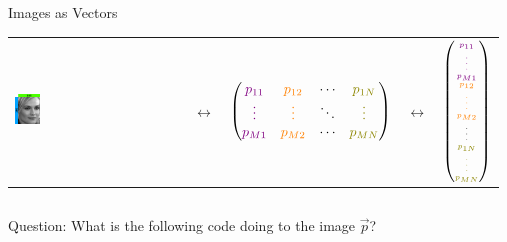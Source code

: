 \documentclass[10pt,aspectratio=169,usenames,dvipsnames]{beamer} %
\begin{document}
\begin{frame}[fragile]{Images as Vectors}
\begin{center}
	\begin{tabular}{m{2.5cm} m{1cm} c m{1cm} c}
	\includegraphics[width=0.15\textwidth]{images/vectormatrix/ImageToVector} &
	$\longleftrightarrow$ &
	$\begin{pmatrix}
		\textcolor{violet}{p_{11}} & \textcolor{orange}{p_{12}} & \cdots & \textcolor{olive}{p_{1N}} \\
		\textcolor{violet}{\vdots} & \textcolor{orange}{\vdots} & \ddots & \textcolor{olive}{\vdots} \\
		\textcolor{violet}{p_{M1}} & \textcolor{orange}{p_{M2}} & \cdots &  \textcolor{olive}{p_{MN}} \\
	\end{pmatrix}$ &
	$\longleftrightarrow$ &
	$\tiny{\begin{pmatrix}
		\textcolor{violet}{p_{11}} \\
		\textcolor{violet}{\vdots} \\
		\textcolor{violet}{p_{M1}} \\
		\textcolor{orange}{p_{12}} \\
		\textcolor{orange}{\vdots} \\
		\textcolor{orange}{p_{M2}} \\
		\vdots \\
		\textcolor{olive}{p_{1N}} \\
		\textcolor{olive}{\vdots} \\
		\textcolor{olive}{p_{MN}} \\
	\end{pmatrix}}$
\end{tabular}
\begin{columns}[T,onlytextwidth]
	\column{\textwidth}
	\begin{block}{Question: What is the following code doing to the image $\vec{p}$?}
		\begin{minipage}{0.45\textwidth}
			\hspace{1cm}

\end{minipage}
\end{block}
\end{columns}
\end{center}
\end{frame}
\end{document}
